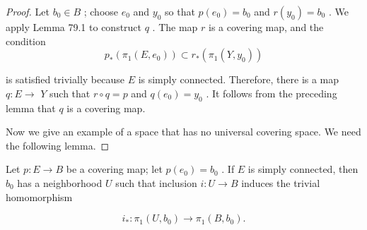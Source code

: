 \begin{proof}Let \({b}_{0} \in  B\) ; choose \({e}_{0}\) and \({y}_{0}\) so that \(p\left( {e}_{0}\right)  = {b}_{0}\) and \(r\left( {y}_{0}\right)  = {b}_{0}\) . We apply Lemma 79.1 to construct \(q\) . The map \(r\) is a covering map, and the condition
\[
{p}_{ * }\left( {{\pi }_{1}\left( {E,{e}_{0}}\right) }\right)  \subset  {r}_{ * }\left( {{\pi }_{1}\left( {Y,{y}_{0}}\right) }\right)
\]

is satisfied trivially because \(E\) is simply connected. Therefore, there is a map \(q : E \rightarrow\)  \(Y\) such that \(r \circ  q = p\) and \(q\left( {e}_{0}\right)  = {y}_{0}\) . It follows from the preceding lemma that \(q\) is a covering map.

Now we give an example of a space that has no universal covering space. We need the following lemma.
\end{proof}
\begin{lemma} Let \(p : E \rightarrow  B\) be a covering map; let \(p\left( {e}_{0}\right)  = {b}_{0}\) . If \(E\) is simply connected, then \({b}_{0}\) has a neighborhood \(U\) such that inclusion \(i : U \rightarrow  B\) induces the trivial homomorphism

\[
{i}_{ * } : {\pi }_{1}\left( {U,{b}_{0}}\right)  \rightarrow  {\pi }_{1}\left( {B,{b}_{0}}\right) .
\]
\end{lemma}

